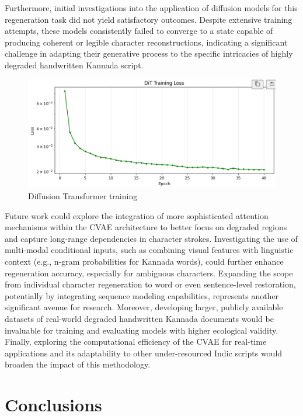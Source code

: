 \documentclass[conference]{IEEEtran}
\begin{document}
Furthermore, initial investigations into the application of diffusion models for this regeneration task did not yield satisfactory outcomes. Despite extensive training attempts, these models consistently failed to converge to a state capable of producing coherent or legible character reconstructions, indicating a significant challenge in adapting their generative process to the specific intricacies of highly degraded handwritten Kannada script.
\begin{figure}[htbp]
    \centering
    \includegraphics[width=\columnwidth]{dit.png} %
    \caption{Diffusion Transformer training}
    \label{fig:single_column_image}
\end{figure}

Future work could explore the integration of more sophisticated attention mechanisms within the CVAE architecture to better focus on degraded regions and capture long-range dependencies in character strokes. Investigating the use of multi-modal conditional inputs, such as combining visual features with linguistic context (e.g., n-gram probabilities for Kannada words), could further enhance regeneration accuracy, especially for ambiguous characters. Expanding the scope from individual character regeneration to word or even sentence-level restoration, potentially by integrating sequence modeling capabilities, represents another significant avenue for research. Moreover, developing larger, publicly available datasets of real-world degraded handwritten Kannada documents would be invaluable for training and evaluating models with higher ecological validity. Finally, exploring the computational efficiency of the CVAE for real-time applications and its adaptability to other under-resourced Indic scripts would broaden the impact of this methodology.


\section{Conclusions}
\end{document}
